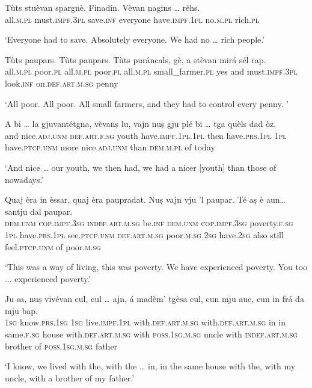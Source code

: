 \begin{linenumbers}
\gll    Tùts stuèvan spargnè. Finadín. Vèvan nagins … réhs.\\
 all.\textsc{m.pl} must.\textsc{impf.3pl} save.\textsc{inf} everyone have.\textsc{impf.1pl} no.\textsc{m.pl} {} rich.\textsc{pl}\\
\end{linenumbers}
\medskip
\glt `Everyone had to save. Absolutely everyone. We had no … rich people.'
\medskip

\begin{linenumbers}
\gll    Tùts paupars. Tùts paupars. Tùts puráncals, gè, a stèvan mirá sél rap.\\
 all.\textsc{m.pl} poor.\textsc{pl} all.\textsc{m.pl} poor.\textsc{pl}  all.\textsc{m.pl} small\_farmer.\textsc{pl} yes and must.\textsc{impf.3pl} look.\textsc{inf} on.\textsc{def.art.m.sg} penny\\
\end{linenumbers}
\medskip
\glt `All poor. All poor. All small farmers, and they had to control every penny. '
\medskip

\begin{linenumbers}
\gll    A bi … la gjuvantétgna, vèvanṣ lu, vajn nuṣ gju plé bi … tga quèls dad òz.\\
and nice.\textsc{adj.unm} {} \textsc{def.art.f.sg} youth have.\textsc{impf.1pl.1pl} then have.\textsc{prs.1pl} \textsc{1pl} have.\textsc{ptcp.unm} more nice.\textsc{adj.unm} {} than \textsc{dem.m.pl} of today\\
\end{linenumbers}
\medskip
\glt `And nice … our youth, we then had, we had a nicer [youth] than those of nowadays.'
\medskip

\begin{linenumbers}
\gll    Quaj èra in èssar, quaj èra paupradat. Nuṣ vajn vju 'l paupar. Té aṣ è aun… santju dal paupar.\\
 \textsc{dem.unm} \textsc{cop.impf.3sg} \textsc{indef.art.m.sg} be.\textsc{inf}  \textsc{dem.unm} \textsc{cop.impf.3sg} poverty.\textsc{f.sg} \textsc{1pl} have.\textsc{prs.1pl} see.\textsc{ptcp.unm} \textsc{def.art.m.sg} poor.\textsc{m.sg} \textsc{2sg} have.\textsc{2sg} also still {} feel.\textsc{ptcp.unm} of poor.\textsc{m.sg}\\
\end{linenumbers}
\medskip
\glt `This was a way of living, this was poverty. We have experienced poverty. You too ... experienced poverty.'
\medskip

\begin{linenumbers}
\gll    Ju sa, nuṣ vivévan  cul, cul … ajn, á madèm' tgèsa cul, cun mju auc, cun in frá da mju bap.\\
 \textsc{1sg} know.\textsc{prs.1sg} \textsc{1sg} live.\textsc{impf.1pl} with.\textsc{def.art.m.sg} with.\textsc{def.art.m.sg} {} in in same.\textsc{f.sg} house with.\textsc{def.art.m.sg} with \textsc{poss.1sg.m.sg} uncle with \textsc{indef.art.m.sg} brother of \textsc{poss.1sg.m.sg} father\\
\end{linenumbers}
\medskip
\glt `I know, we lived with the, with the … in, in the same house with the, with my uncle, with a brother of my father.'
\medskip


